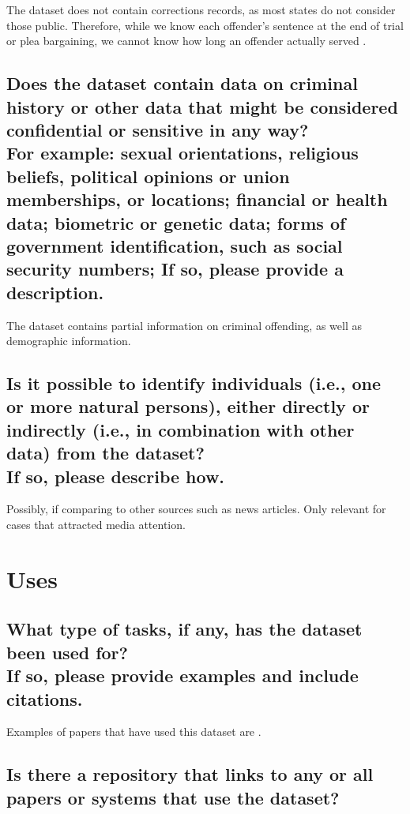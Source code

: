 \documentclass[letterpaper, 10 pt, conference]{ieeeconf}  %
\newcommand{\subtitle}[1]{{\\ \small \normalfont \color{purple} #1}}
\begin{document}
The dataset does not contain corrections records, as most states do not consider those public. Therefore, while we know each offender’s sentence at the end of trial or plea bargaining, we cannot know how long an
offender actually served \cite{ormachea2015new}.

\subsection{Does the dataset contain data on criminal history or other data that might be considered confidential or sensitive in any way? \subtitle{For example: sexual orientations, religious beliefs, political opinions or union memberships, or locations; financial or health data; biometric or genetic data; forms of government identification, such as social security numbers; If so, please provide a description.}}

The dataset contains partial information on criminal offending, as well as demographic information. 

\subsection{Is it possible to identify individuals (i.e., one or more natural persons), either directly or indirectly (i.e., in combination with other data) from the dataset? \subtitle{If so, please describe how.}}

Possibly, if comparing to other sources such as news articles. Only relevant for cases that attracted media attention. 

\section{Uses}

\subsection{What type of tasks, if any, has the dataset been used for? \subtitle{If so, please provide examples and include citations.}}

Examples of papers that have used this dataset are \cite{ormachea2016enabling,bouffard2019time,cooper2018difference,pfeffer2018gendered}.


\subsection{Is there a repository that links to any or all papers or systems that use the dataset?}
\end{document}

